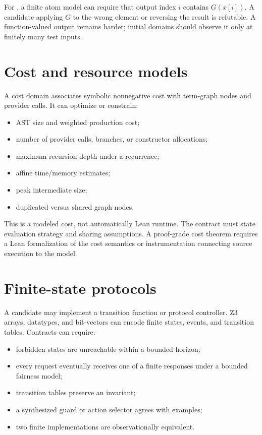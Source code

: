 \documentclass[10pt,letterpaper,oneside]{report}
\newcommand{\code}[1]{\texttt{\detokenize{#1}}}
\begin{document}
For \code{List.map}, a finite atom model can require that output index $i$ contains $G(x[i])$. A candidate applying $G$ to the wrong element or reversing the result is refutable. A function-valued output remains harder; initial domains should observe it only at finitely many test inputs.

\section{Cost and resource models}

A cost domain associates symbolic nonnegative cost with term-graph nodes and provider calls. It can optimize or constrain:

\begin{itemize}
\item AST size and weighted production cost;
\item number of provider calls, branches, or constructor allocations;
\item maximum recursion depth under a recurrence;
\item affine time/memory estimates;
\item peak intermediate size;
\item duplicated versus shared graph nodes.
\end{itemize}

This is a modeled cost, not automatically Lean runtime. The contract must state evaluation strategy and sharing assumptions. A proof-grade cost theorem requires a Lean formalization of the cost semantics or instrumentation connecting source execution to the model.

\section{Finite-state protocols}

A candidate may implement a transition function or protocol controller. Z3 arrays, datatypes, and bit-vectors can encode finite states, events, and transition tables. Contracts can require:

\begin{itemize}
\item forbidden states are unreachable within a bounded horizon;
\item every request eventually receives one of a finite responses under a bounded fairness model;
\item transition tables preserve an invariant;
\item a synthesized guard or action selector agrees with examples;
\item two finite implementations are observationally equivalent.
\end{itemize}
\end{document}
